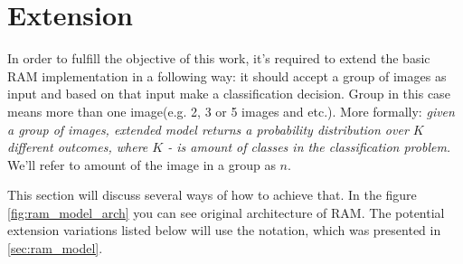 














%
%
%


\section{Extension}
\label{sec:extension}
In order to fulfill the objective of this work, it's required to extend the basic
RAM implementation in a following way: it should accept a group of images as input
and based on that input make a classification decision. Group in this case means
more than one image(e.g. 2, 3 or 5 images and etc.). More formally:
\textit{given a group of images, extended model returns a probability distribution over
$K$ different outcomes, where $K$ - is amount of classes in the classification problem.}
We'll refer to amount of the image in a group as $n$.

This section will discuss several ways of how to achieve that.
In the figure \ref{fig:ram_model_arch} you can see original architecture of RAM.
The potential extension variations listed below will use the notation, which
was presented in \autoref{sec:ram_model}.

